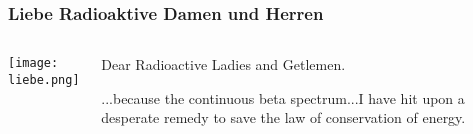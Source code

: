 


\begin{frame}
\frametitle{Liebe Radioaktive Damen und Herren}
\begin{columns}
 
\texttt{[image: liebe.png]}
 
\begin{block}{}
Dear Radioactive Ladies and Getlemen.

...because the continuous beta spectrum...I have hit upon a desperate remedy to save the law of conservation of energy.

\end{block}
\end{columns}
\end{frame}

